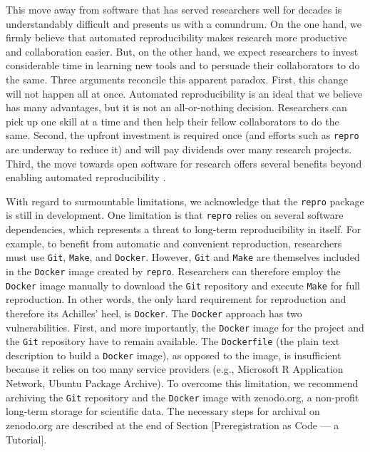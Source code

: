 \documentclass[psych,tutorial,submit,moreauthors,pdftex]{mdpi}
\begin{document}
This move away from software that has served researchers well for
decades is understandably difficult and presents us with a conundrum. On
the one hand, we firmly believe that automated reproducibility makes
research more productive and collaboration easier. But, on the other
hand, we expect researchers to invest considerable time in learning new
tools and to persuade their collaborators to do the same. Three
arguments reconcile this apparent paradox. First, this change will not
happen all at once. Automated reproducibility is an ideal that we
believe has many advantages, but it is not an all-or-nothing decision.
Researchers can pick up one skill at a time and then help their fellow
collaborators to do the same. Second, the upfront investment is required
once (and efforts such as \texttt{repro} are underway to reduce it) and
will pay dividends over many research projects. Third, the move towards
open software for research offers several benefits beyond enabling
automated reproducibility
\citep{schaffnerFutureScientificJournals1994, fitzgeraldTransformationOpenSource2006, chaldecottHistoryScientificTechnical1965, sonnenburgNeedOpenSource2007}.

With regard to surmountable limitations, we acknowledge that the
\texttt{repro} package is still in development. One limitation is that
\texttt{repro} relies on several software dependencies, which represents
a threat to long-term reproducibility in itself. For example, to benefit
from automatic and convenient reproduction, researchers must use
\texttt{Git}, \texttt{Make}, and \texttt{Docker}. However, \texttt{Git}
and \texttt{Make} are themselves included in the \texttt{Docker} image
created by \texttt{repro}. Researchers can therefore employ the
\texttt{Docker} image manually to download the \texttt{Git} repository
and execute \texttt{Make} for full reproduction. In other words, the
only hard requirement for reproduction and therefore its Achilles' heel,
is \texttt{Docker}. The \texttt{Docker} approach has two
vulnerabilities. First, and more importantly, the \texttt{Docker} image
for the project and the \texttt{Git} repository have to remain
available. The \texttt{Dockerfile} (the plain text description to build
a \texttt{Docker} image), as opposed to the image, is insufficient
because it relies on too many service providers (e.g., Microsoft R
Application Network, Ubuntu Package Archive). To overcome this
limitation, we recommend archiving the \texttt{Git} repository and the
\texttt{Docker} image with zenodo.org, a non-profit long-term storage
for scientific data. The necessary steps for archival on zenodo.org are
described at the end of Section {[}Preregistration as Code --- a
Tutorial{]}.
\end{document}
